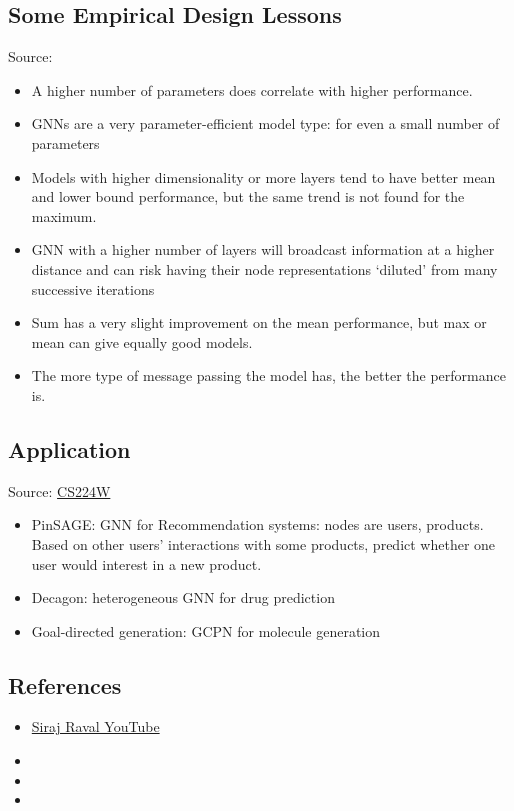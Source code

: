 \subsection{Some Empirical Design Lessons}
Source: 
\begin{itemize}
	\item A higher number of parameters does correlate with higher performance.
	\item \ac{GNN}s are a very parameter-efficient model type: for even a small number of parameters
	\item Models with higher dimensionality or more layers tend to have better mean and lower bound performance, but the same trend is not found for the maximum.
	\item \ac{GNN} with a higher number of layers will broadcast information at a higher distance and can risk having their node representations ‘diluted’ from many successive iterations
	\item Sum has a very slight improvement on the mean performance, but max or mean can give equally good models.
	\item The more type of message passing the model has, the better the performance is.
\end{itemize}

\subsection{Application}
Source: \href{https://youtu.be/p2aqXKfRXEA}{CS224W}
\begin{itemize}
	\item PinSAGE: \ac{GNN} for Recommendation systems: nodes are users, products. Based on other users' interactions with some products, predict whether one user would interest in a new product.
	\item Decagon: heterogeneous \ac{GNN} for drug prediction
	\item Goal-directed generation: GCPN for molecule generation
\end{itemize}

\subsection{References}
\begin{itemize}
	\item \href{https://youtu.be/bA261BF0bdk}{Siraj Raval YouTube}
	\item {}
	\item {}
	\item {}
\end{itemize}

